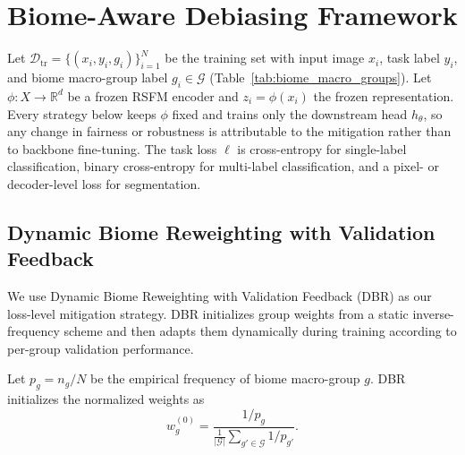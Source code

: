 \documentclass[10pt,twocolumn,letterpaper]{article}
\begin{document}
\section{Biome-Aware Debiasing Framework}

Let \(\mathcal{D}_{\mathrm{tr}}=\{(x_i,y_i,g_i)\}_{i=1}^{N}\) be the training set with input image \(x_i\), task label \(y_i\), and biome macro-group label \(g_i\in\mathcal{G}\) (Table~\ref{tab:biome_macro_groups}). Let \(\phi:X\rightarrow\mathbb{R}^{d}\) be a frozen RSFM encoder and \(z_i=\phi(x_i)\) the frozen representation. Every strategy below keeps \(\phi\) fixed and trains only the downstream head \(h_\theta\), so any change in fairness or robustness is attributable to the mitigation rather than to backbone fine-tuning. The task loss \(\ell\) is cross-entropy for single-label classification, binary cross-entropy for multi-label classification, and a pixel- or decoder-level loss for segmentation.

\subsection{Dynamic Biome Reweighting with Validation Feedback}

We use Dynamic Biome Reweighting with Validation Feedback (DBR) as our loss-level mitigation strategy. DBR initializes group weights from a static inverse-frequency scheme and then adapts them dynamically during training according to per-group validation performance.

Let \(p_g = n_g / N\) be the empirical frequency of biome macro-group \(g\). DBR initializes the normalized weights as
\begin{equation}
w_g^{(0)}=\frac{1/p_g}{\frac{1}{|\mathcal{G}|}\sum_{g'\in\mathcal{G}}1/p_{g'}}\label{eq:wg}.
\end{equation}
\end{document}
